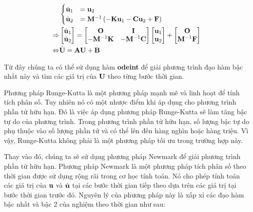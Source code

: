 \begin{equation}
    \begin{aligned}
    &\begin{cases}
        \dot{\bf u}_1 &= {\bf u}_2 \\
        \dot{\bf u}_2 &= {\bf M}^{-1}\left(-{\bf K}{\bf u}_1-{\bf C}{\bf u}_2 + {\bf F}\right)
    \end{cases} \\
    \Rightarrow &\begin{bmatrix}
        \dot{\bf u}_1 \\ \dot{\bf u}_2
    \end{bmatrix} = \begin{bmatrix}
        {\bf O} & {\bf I} \\
        -{\bf M}^{-1}{\bf K} & -{\bf M}^{-1}{\bf C}
    \end{bmatrix}\begin{bmatrix}
        {\bf u}_1 \\ {\bf u}_2
    \end{bmatrix} + \begin{bmatrix}
        {\bf O} \\ {\bf M}^{-1}{\bf F}
    \end{bmatrix} \\
    \Leftrightarrow & \dot{\bf U} = {\bf A} {\bf U} + {\bf B}
    \end{aligned}
\end{equation}

Từ đây chúng ta có thể sử dụng hàm \textbf{odeint} để giải phương trình đạo hàm bậc nhất này và tìm các giá trị của ${\bf U}$ theo từng bước thời gian.

Phương pháp Runge-Kutta là một phương pháp mạnh mẽ và linh hoạt để  tính tích phân số. Tuy nhiên nó có một nhược điểm khi áp dụng cho phương trình phần tử hữu hạn. Đó là việc áp dụng phương pháp Runge-Kutta sẽ làm tăng bậc tự do của phương trình. Trong phương trình phần tử hữu hạn, số lượng bậc tự do phụ thuộc vào số lượng phần tử và có thể lên đến hàng nghìn hoặc hàng triệu. Vì vậy, Runge-Kutta không phải là một phương pháp tối ưu trong trường hợp này.

Thay vào đó, chúng ta sẽ sử dụng phương pháp Newmark để giải phương trình phần tử hữu hạn. Phương pháp Newmark là một phương pháp tích phân số theo thời gian được sử dụng rộng rãi trong cơ học tính toán. Nó cho phép tính toán các giá trị của ${\bf u}$ và $\dot{\bf u}$ tại các bước thời gian tiếp theo dựa trên các giá trị tại bước thời gian trước đó. Nguyên lý của phương pháp này là xấp xỉ các đạo hàm bậc nhất và bậc 2 của nghiệm theo thời gian như sau:

